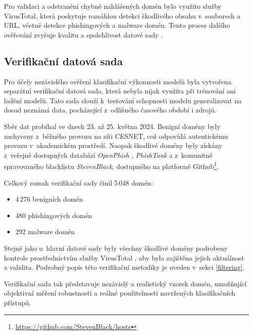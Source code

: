 Pro validaci a odstranění chybně nahlášených domén bylo využito služby VirusTotal, která poskytuje rozsáhlou detekci škodlivého obsahu v~souborech a URL, včetně detekce phishingových a malware domén. Tento proces dalšího ověřování zvyšuje kvalitu a spolehlivost datové sady \cite{virtotal}.



\subsection{Verifikační datová sada}
\label{clftest}

Pro účely nezávislého ověření klasifikační výkonnosti modelů byla vytvořena separátní verifikační datová sada, která nebyla nijak využita při trénování ani ladění modelů. Tato sada slouží k~testování schopnosti modelu generalizovat na dosud neznámá data, pocházející z~odlišného časového období i zdrojů. 

Sběr dat probíhal ve dnech 23. až 25. května 2024. Benigní domény byly zachyceny z~běžného provozu na síti CESNET, což odpovídá autentickému provozu v~akademickém prostředí. Naopak škodlivé domény byly získány z~veřejně dostupných databází \textit{OpenPhish} \cite{openphish-web}, \textit{PhishTank} \cite{phishtank-web} a z~komunitně spravovaného blacklistu \textit{StevenBlack}, dostupného na platformě Github\footnote{\url{https://github.com/StevenBlack/hosts}}.

Celkový rozsah verifikační sady činil 5\,048 domén:
\begin{itemize}
    \item 4\,276 benigních domén
    \item 480 phishingových domén
    \item 292 malware domén
\end{itemize}

Stejně jako u~hlavní datové sady byly všechny škodlivé domény podrobeny kontrole prostřednictvím služby VirusTotal \cite{virtotal}, aby byla zajištěna jejich aktuálnost a validita. Podrobný popis této verifikační metodiky je uveden v~sekci \ref{filtering}.

Verifikační sada tak představuje nezávislý a realistický vzorek domén, umožňující objektivní měření robustnosti a reálné použitelnosti navržených klasifikačních přístupů.


